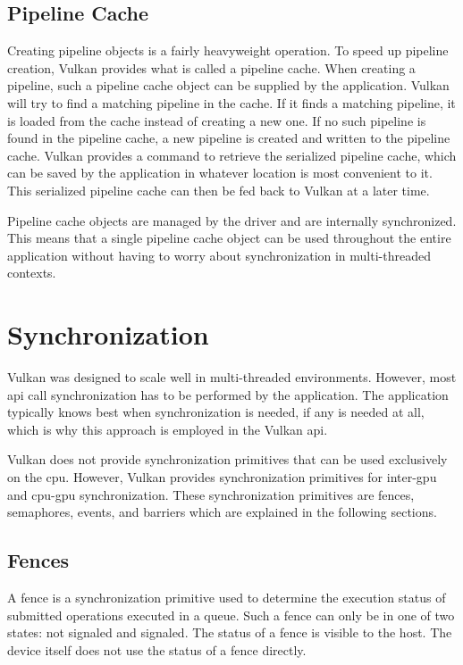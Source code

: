     \subsection{Pipeline Cache}
    \label{subsec:PipelineCache}
      Creating pipeline objects is a fairly heavyweight operation.
      To speed up pipeline creation, Vulkan provides what is called a pipeline cache.
      When creating a pipeline, such a pipeline cache object can be supplied by the application.
      Vulkan will try to find a matching pipeline in the cache.
      If it finds a matching pipeline, it is loaded from the cache instead of creating a new one.
      If no such pipeline is found in the pipeline cache, a new pipeline is created and written to the pipeline cache.
      Vulkan provides a command to retrieve the serialized pipeline cache, which can be saved by the application in whatever location is most convenient to it.
      This serialized pipeline cache can then be fed back to Vulkan at a later time.

      Pipeline cache objects are managed by the \gls{driver} and are internally synchronized.
      This means that a single pipeline cache object can be used throughout the entire application without having to worry about synchronization in multi-threaded contexts.


  \section{Synchronization}
    Vulkan was designed to scale well in multi-threaded environments.
    However, most \gls{api} call synchronization has to be performed by the application.
    The application typically knows best when synchronization is needed, if any is needed at all, which is why this approach is employed in the Vulkan \gls{api}.

    Vulkan does not provide synchronization primitives that can be used exclusively on the \gls{cpu}.
    However, Vulkan provides synchronization primitives for inter-\gls{gpu} and \gls{cpu}-\gls{gpu} synchronization.
    These synchronization primitives are fences, semaphores, events, and barriers which are explained in the following sections.

    \subsection{Fences}
    \label{sub:Fences}
      A fence is a synchronization primitive used to determine the execution status of submitted operations executed in a queue.
      Such a fence can only be in one of two states: not signaled and signaled.
      The status of a fence is visible to the host.
      The device itself does not use the status of a fence directly.

